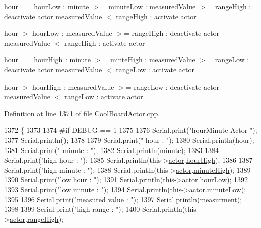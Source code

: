 hour == hour\+Low \+: minute $>$= minute\+Low \+: measured\+Value $>$= range\+High \+: deactivate actor measured\+Value $<$ range\+High \+: activate actor

hour $>$ hour\+Low \+: measured\+Value $>$= range\+High \+: deactivate actor measured\+Value $<$ range\+High \+: activate actor

hour == hour\+High \+: minute $>$= minte\+High \+: measured\+Value $>$= range\+Low \+: deactivate actor measured\+Value $<$ range\+Low \+: activate actor

hour $>$ hour\+High \+: measured\+Value $>$= range\+Low \+: deactivate actor measured\+Value $<$ range\+Low \+: activate actor 

Definition at line 1371 of file Cool\+Board\+Actor.\+cpp.


\begin{DoxyCode}
1372 \{
1373 
1374 \textcolor{preprocessor}{#if DEBUG == 1}
1375     
1376     Serial.print(\textcolor{stringliteral}{"hourMinute Actor  "});
1377     Serial.println();
1378 
1379     Serial.print(\textcolor{stringliteral}{" hour : "});
1380     Serial.println(hour);
1381     Serial.print(\textcolor{stringliteral}{" minute : "});
1382     Serial.println(minute);
1383 
1384     Serial.print(\textcolor{stringliteral}{"high hour : "});
1385     Serial.println(this->\hyperlink{class_cool_board_actor_a8f190db9f7a39fddbcef7f152da970e9}{actor}.\hyperlink{struct_cool_board_actor_1_1state_acd1af3ac2382258a5b05497d814adc01}{hourHigh});
1386 
1387     Serial.print(\textcolor{stringliteral}{"high minute : "});
1388     Serial.println(this->\hyperlink{class_cool_board_actor_a8f190db9f7a39fddbcef7f152da970e9}{actor}.\hyperlink{struct_cool_board_actor_1_1state_a4bff3d61ead74adb60be224764b93006}{minuteHigh});
1389 
1390     Serial.print(\textcolor{stringliteral}{"low hour : "});
1391     Serial.println(this->\hyperlink{class_cool_board_actor_a8f190db9f7a39fddbcef7f152da970e9}{actor}.\hyperlink{struct_cool_board_actor_1_1state_ae7034bf95b36f1392f9de076fa0c8c0f}{hourLow});
1392 
1393     Serial.print(\textcolor{stringliteral}{"low minute : "});
1394     Serial.println(this->\hyperlink{class_cool_board_actor_a8f190db9f7a39fddbcef7f152da970e9}{actor}.\hyperlink{struct_cool_board_actor_1_1state_acbcc2902331fd9d757cd475eb403bdd9}{minuteLow});
1395 
1396     Serial.print(\textcolor{stringliteral}{"measured value : "});
1397     Serial.println(measurment);
1398 
1399     Serial.print(\textcolor{stringliteral}{"high range : "});
1400     Serial.println(this->\hyperlink{class_cool_board_actor_a8f190db9f7a39fddbcef7f152da970e9}{actor}.\hyperlink{struct_cool_board_actor_1_1state_a6e5cd6c5cd44e2decfd8d4df1853f8e3}{rangeHigh});

\end{DoxyCode}

